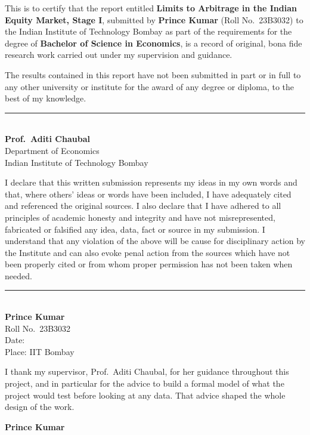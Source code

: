 \setcounter{page}{1}
\pagestyle{body}

\thispagestyle{body}
This is to certify that the report entitled \textbf{Limits to Arbitrage in the Indian Equity Market, Stage I},
submitted by \textbf{Prince Kumar} (Roll No.\ 23B3032) to the Indian Institute of Technology Bombay as part of the
requirements for the degree of \textbf{Bachelor of Science in Economics}, is a record of original, bona fide research
work carried out under my supervision and guidance.

The results contained in this report have not been submitted in part or in full to any other university or institute
for the award of any degree or diploma, to the best of my knowledge.

\vspace{3cm}
\noindent\rule{6.5cm}{0.4pt}\\
\textbf{Prof.\ Aditi Chaubal}\\
Department of Economics\\
Indian Institute of Technology Bombay

\clearpage
{}
I declare that this written submission represents my ideas in my own words and that, where others' ideas or words have
been included, I have adequately cited and referenced the original sources. I also declare that I have adhered to all
principles of academic honesty and integrity and have not misrepresented, fabricated or falsified any idea, data, fact
or source in my submission. I understand that any violation of the above will be cause for disciplinary action by the
Institute and can also evoke penal action from the sources which have not been properly cited or from whom proper
permission has not been taken when needed.

\vspace{3cm}
\noindent\rule{6.5cm}{0.4pt}\\
\textbf{Prince Kumar}\\
Roll No.\ 23B3032\\
Date:\\
Place: IIT Bombay

\clearpage
{}
I thank my supervisor, Prof.\ Aditi Chaubal, for her guidance throughout this project, and in particular for the
advice to build a formal model of what the project would test before looking at any data. That advice shaped the
whole design of the work.

\vspace{1.5cm}
\noindent\textbf{Prince Kumar}

\clearpage
{\tableofcontents}
\clearpage

